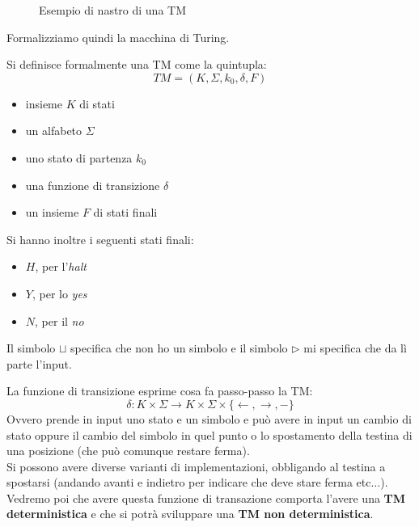\documentclass[a4paper,12pt, oneside]{book}
\begin{document}
\begin{figure}
  \centering
  \caption{Esempio di nastro di una TM}
  \label{fig:tur}
\end{figure}
Formalizziamo quindi la macchina di Turing.
\begin{definizione}
  Si definisce formalmente una TM come la quintupla:
  \[TM=(K,\Sigma,k_0, \delta, F)\]
  \begin{itemize}
    \item insieme $K$ di stati
    \item un alfabeto $\Sigma$
    \item uno stato di partenza $k_0$
    \item una funzione di transizione $\delta$
    \item un insieme $F$ di stati finali
  \end{itemize}
  Si hanno inoltre i seguenti stati finali:
  \begin{itemize}
    \item $H$, per l'\textit{halt}
    \item $Y$, per lo \textit{yes}
    \item $N$, per il \textit{no}
  \end{itemize}
  Il simbolo $\sqcup$ specifica che non ho un simbolo e il simbolo
  $\triangleright$ mi specifica che da lì parte l'input.
\end{definizione}
\begin{definizione}
  La funzione di transizione esprime cosa fa passo-passo la TM:
  \[\delta:K\times\Sigma\to K\times \Sigma\times\{\leftarrow,\rightarrow,-\}\]
  Ovvero prende in input uno stato e un simbolo e può avere in input un cambio
  di stato oppure il cambio del simbolo in quel punto o lo spostamento della
  testina di una posizione (che può comunque restare ferma).\\
  Si possono avere diverse varianti di implementazioni, obbligando al testina a
  spostarsi (andando avanti e indietro per indicare che deve stare ferma
  etc$\ldots$).\\
  Vedremo poi che avere questa funzione di transazione comporta l'avere una
  \textbf{TM deterministica} e che si potrà sviluppare una \textbf{TM non
    deterministica}.
\end{definizione}
\end{document}
